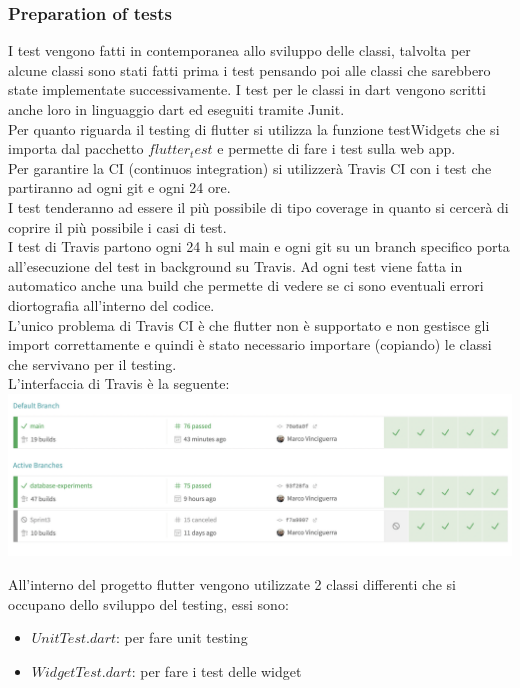\documentclass{article}
\begin{document}
\subsubsection{Preparation of tests}
I test vengono fatti in contemporanea allo sviluppo delle classi, talvolta per alcune classi
sono stati fatti prima i test pensando poi alle classi che sarebbero state implementate successivamente.
I test per le classi in dart vengono scritti anche loro in linguaggio dart ed eseguiti tramite Junit.
\\Per quanto riguarda il testing di flutter si utilizza la funzione testWidgets che si importa 
dal pacchetto $flutter_test$ e permette di fare i test sulla web app.
\\Per garantire la CI (continuos integration) si utilizzerà Travis CI con i test che partiranno ad
ogni git e ogni 24 ore.
\\I test tenderanno ad essere il più possibile di tipo coverage in quanto si cercerà di coprire 
il più possibile i casi di test.
\\I test di Travis partono ogni 24 h sul main e ogni git su un branch specifico porta all'esecuzione 
del test in background su Travis. Ad ogni test viene fatta in automatico anche una build che permette
di vedere se ci sono eventuali errori diortografia all'interno del codice.
\\L'unico problema di Travis CI è che flutter non è supportato e non gestisce gli import correttamente e quindi è stato necessario importare (copiando) le classi che 
servivano per il testing.
\\L'interfaccia di Travis è la seguente:
\\\includegraphics[scale = 0.25]{"Immagini/Travis.PNG"}

All'interno del progetto flutter vengono utilizzate 2 classi differenti che si occupano dello 
sviluppo del testing, essi sono:
\begin{itemize}
    \item $UnitTest.dart$: per fare unit testing
    \item $WidgetTest.dart$: per fare i test delle widget
\end{itemize}
\end{document}
